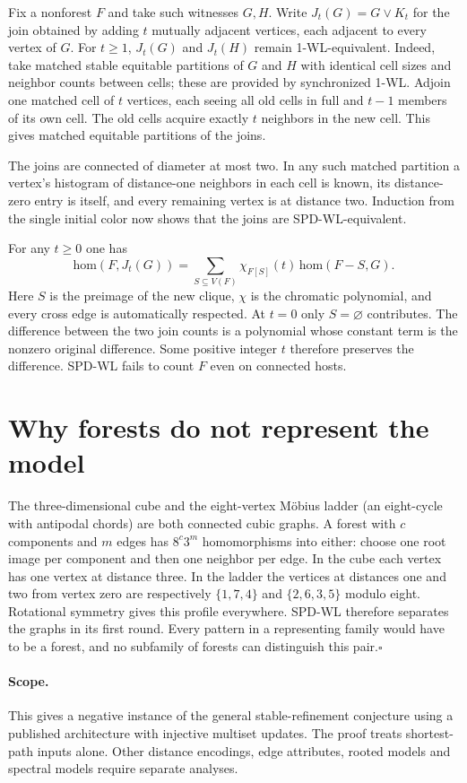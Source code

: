 \documentclass[11pt]{article}
\begin{document}
Fix a nonforest $F$ and take such witnesses $G,H$. Write $J_t(G)=G\vee K_t$ for the join obtained by adding $t$ mutually adjacent vertices, each adjacent to every vertex of $G$. For $t\ge1$, $J_t(G)$ and $J_t(H)$ remain 1-WL-equivalent. Indeed, take matched stable equitable partitions of $G$ and $H$ with identical cell sizes and neighbor counts between cells; these are provided by synchronized 1-WL. Adjoin one matched cell of $t$ vertices, each seeing all old cells in full and $t-1$ members of its own cell. The old cells acquire exactly $t$ neighbors in the new cell. This gives matched equitable partitions of the joins.

The joins are connected of diameter at most two. In any such matched partition a vertex's histogram of distance-one neighbors in each cell is known, its distance-zero entry is itself, and every remaining vertex is at distance two. Induction from the single initial color now shows that the joins are SPD-WL-equivalent.

For any $t\ge0$ one has
\[
 \mathrm{hom}(F,J_t(G))=\sum_{S\subseteq V(F)}
     \chi_{F[S]}(t)\,\mathrm{hom}(F-S,G).
\]
Here $S$ is the preimage of the new clique, $\chi$ is the chromatic polynomial, and every cross edge is automatically respected. At $t=0$ only $S=\varnothing$ contributes. The difference between the two join counts is a polynomial whose constant term is the nonzero original difference. Some positive integer $t$ therefore preserves the difference. SPD-WL fails to count $F$ even on connected hosts.

\section*{Why forests do not represent the model}
The three-dimensional cube and the eight-vertex M\"obius ladder (an eight-cycle with antipodal chords) are both connected cubic graphs. A forest with $c$ components and $m$ edges has $8^c3^m$ homomorphisms into either: choose one root image per component and then one neighbor per edge. In the cube each vertex has one vertex at distance three. In the ladder the vertices at distances one and two from vertex zero are respectively $\{1,7,4\}$ and $\{2,6,3,5\}$ modulo eight. Rotational symmetry gives this profile everywhere. SPD-WL therefore separates the graphs in its first round. Every pattern in a representing family would have to be a forest, and no subfamily of forests can distinguish this pair.\hfill$\square$

\paragraph{Scope.} This gives a negative instance of the general stable-refinement conjecture using a published architecture with injective multiset updates. The proof treats shortest-path inputs alone. Other distance encodings, edge attributes, rooted models and spectral models require separate analyses.
\end{document}

